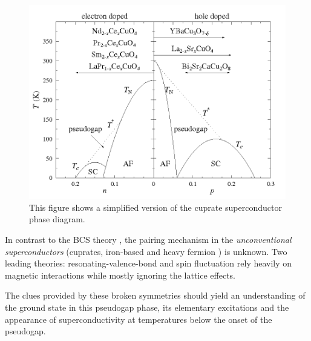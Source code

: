 \begin{figure}[h]
  \centering
  \includegraphics[width=1.0\textwidth]{images/CuPhaseDiag.png}
  \caption{This figure shows a simplified version of the cuprate superconductor phase diagram. \protect\cite{CuPhaseDiag}}
  \label{fig:CuPhaseDiag}
\end{figure}



In contrast to the BCS theory \cite{Bardeen1957}, the pairing mechanism in the \textit{unconventional superconductors} (cuprates, iron-based and heavy fermion \cite{Pfleiderer2009}) is unknown.
Two leading theories: resonating-valence-bond \cite{?} and spin fluctuation \cite{Scalapino2012} rely heavily on magnetic interactions while mostly ignoring the lattice effects.


The clues provided by these broken symmetries should yield an understanding of the ground state in this pseudogap phase, its elementary excitations and the appearance of superconductivity at temperatures below the onset of the pseudogap. 

